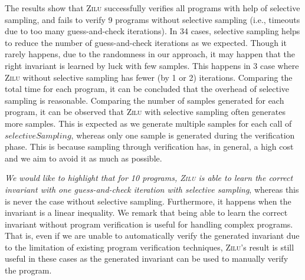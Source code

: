 The results show that \textsc{Zilu} successfully verifies all programs with help of selective sampling, and fails to verify 9 programs without selective sampling (i.e., timeouts due to too many guess-and-check iterations). In 34 cases, selective sampling helps to reduce the number of guess-and-check iterations as we expected. Though it rarely happens, due to the randomness in our approach, it may happen that the right invariant is learned by luck with few samples. This happens in 3 case where \textsc{Zilu} without selective sampling has fewer (by 1 or 2) iterations. Comparing the total time for each program, it can be concluded that the overhead of selective sampling is reasonable. Comparing the number of samples generated for each program, it can be observed that \textsc{Zilu} with selective sampling often generates more samples. This is expected as we generate multiple samples for each call of $selectiveSampling$, whereas only one sample is generated during the verification phase. This is because sampling through verification has, in general, a high cost and we aim to avoid it as much as possible.
%

\emph{We would like to highlight that for 10 programs, \textsc{Zilu} is able to learn the correct invariant with one guess-and-check iteration with selective sampling}, whereas this is never the case without selective sampling. Furthermore, it happens when the invariant is a linear inequality. We remark that being able to learn the correct invariant without program verification is useful for handling complex programs. That is, even if we are unable to automatically verify the generated invariant due to the limitation of existing program verification techniques, \textsc{Zilu}'s result is still useful in these cases as the generated invariant can be used to manually verify the program.

